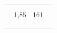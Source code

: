 \begin{table}[H]
\begin{tabular}{lccl}
                                                                                    &                                                                       &                                                               &                                                                                                                                                                                               \\
                                                                                    &                                                                       &                                                               &                                                                                                                                                                                               \\
                                                                                    & 1,85                                                                  & 161                                                           &                                                                                                                                                                                               \\
                                                                                    &                                                                       &                                                               &                                                                                                                                                                                               \\
                                                                                    &                                                                       &                                                               &                                                                                                                                                                                               \\
                                                                                    &                                                                       &                                                               &                                                                                                                                                                                               \\ \hline

\end{tabular}
\end{table}
